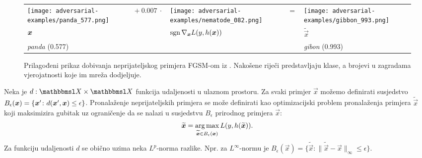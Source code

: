 \documentclass[utf8, diplomski, lmodern]{fer}
\begin{document}
\begin{figure}
	\centering
	\begin{tabular}{>{\centering\arraybackslash}m{}m{.5in}>{\centering\arraybackslash}m{}m{.1in}>{\centering\arraybackslash}m{}}
		\centering\arraybackslash
		\texttt{[image: adversarial-examples/panda\_577.png]} &%
		\centering\arraybackslash%
		$ +\ 0.007\ \cdot$ &%
		\texttt{[image: adversarial-examples/nematode\_082.png]} &%
		$=$ & %
		\texttt{[image: adversarial-examples/gibbon\_993.png]} \\
		$\centering \vec x$     &%
		& $\sgn \nabla_{\vec x} L(y,h(\vec x))$ & & $\widetilde{\vec x}$ \\
		\emph{panda} (0.577) & & & & \emph{gibon} (0.993) 
	\end{tabular}
	\caption{Prilagođeni prikaz dobivanja neprijateljskog primjera FGSM-om iz \cite{Goodfellow:2014:EHAE}. Nakošene riječi predstavljaju klase, a brojevi u zagradama vjerojatnosti koje im mreža dodjeljuje.}
	\label{fig:neprijateljski-primjer}
\end{figure}

Neka je $d:\set{X}\times\set{X}$ funkcija udaljenosti u ulaznom prostoru. Za svaki primjer $\vec x$ možemo definirati susjedstvo $B_\epsilon(\vec x) = \cbr{\vec x' \colon d(\vec x',\vec x)\leq\epsilon}$. Pronalaženje neprijateljskih primjera se može definirati kao optimizacijski problem pronalaženja primjera $\widetilde{\vec x}$ koji maksimizira gubitak uz ograničenje da se nalazi u susjedstvu $B_\epsilon$ prirodnog primjera $\vec x$:
\begin{equation} \label{eq:neprijateljski-primjer}
\widetilde{\vec x} = \argmax_{\widetilde{\vec x}\in B_\epsilon(\vec x)} L(y,h(\widetilde{\vec x})) \text{.}
\end{equation}
Za funkciju udaljenosti $d$ se obično uzima neka $L^p$-norma razlike. Npr. za $L^\infty$-normu je $B_\epsilon(\vec x) = \{\widetilde{\vec x} : \lVert \widetilde{\vec x}-\vec x\rVert_\infty\leq\epsilon\}$.
\end{document}
